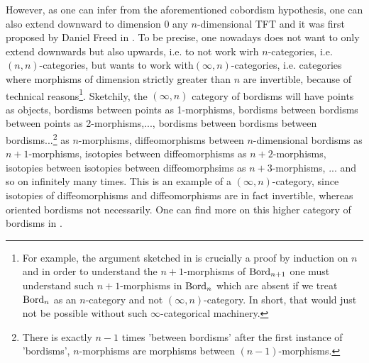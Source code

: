 \begin{rem}
    However, as one can infer from the aforementioned cobordism hypothesis, one can also extend downward to dimension $0$ any $n$-dimensional TFT and it was first proposed by Daniel Freed in \cite{Freed_1994}. To be precise, one nowadays does not want to only extend 
    downwards but also upwards, i.e. to not work wirh $n$-categories, i.e. $(n,n)$-categories,
     but wants to work with$(\infty,n)$-categories, i.e. categories where morphisms of dimension
      strictly greater than $n$ are invertible, because of technical reasons\footnote{For example, the
         argument sketched in \cite{lurie2009classification} is crucially a proof by induction on $n$
          and in order to understand the $n+1$-morphisms of $\operatorname{Bord}_{n+1}$ one must understand
           such $n+1$-morphisms in $\operatorname{Bord}_{n}$ which are absent if we treat $\operatorname{Bord}_{n}$ as an
            $n$-category and not $(\infty,n)$-category. In short, that would just not be possible
             without such $\infty$-categorical machinery.}. 
     Sketchily, the $(\infty,n)$ category of bordisms will have points as objects, bordisms between
      points as 1-morphisms, bordisms between bordisms between points as 2-morphisms,...,
       bordisms between bordisms between bordisms...\footnote{There is exactly $n-1$ times
         'between bordisms' after the first instance of 'bordisms', $n$-morphisms are morphisms
          between $(n-1)$-morphisms.} as $n$-morphisms, diffeomorphisms between
           $n$-dimensional bordisms as $n+1$-morphisms, isotopies between diffeomorphisms as
            $n+2$-morphisms, isotopies between isotopies between diffeomorphsims as
             $n+3$-morphisms, ... and so on infinitely many times.
              This is an example of a $(\infty,n)$-category, since isotopies of diffeomorphisms and
               diffeomorphisms are in fact invertible, whereas oriented bordisms not necessarily.
                One can find more on this higher category of bordisms in \cite{Calaque_2019}. 

\end{rem}